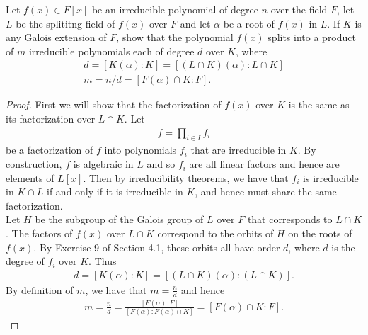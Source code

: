 \documentclass[num=12,duedate=04-28-21,course=Algebra\ II,proflastname=Walton]{hwtemplate}
\begin{document}
\problem[5] %
\begin{claim}
	Let \(f(x) \in F[x]\) be an irreducible polynomial of degree \(n\) over the field \(F\), let \(L\) be the splititng field of \(f(x)\) over \(F\) and let \(\alpha \) be a root of \(f(x)\) in \(L\). If \(K\) is any Galois extension of \(F\), show that the polynomial \(f(x)\) splits into a product of \(m\) irreducible polynomials each of degree \(d\) over \(K\), where
	\begin{align*}
		d = [K(\alpha ):K] = [(L\cap K)(\alpha ) : L\cap K]\\
		m = n / d = [F(\alpha )\cap K : F].
	\end{align*}
\end{claim}

\begin{proof}
	First we will show that the factorization of \(f(x)\) over \(K\) is the same as its factorization over \(L \cap K\). Let
	\begin{align*}
		f = \prod_{i \in I} f_i 
	\end{align*}
	be a factorization of \(f\) into polynomials \(f_i\) that are irreducible in \(K\). By construction, \(f\) is algebraic in \(L\) and so \(f_i\) are all linear factors and hence are elements of \(L[x]\). Then by irreducibility theorems, we have that \(f_i\) is irreducible in \(K\cap L\) if and only if it is irreducible in \(K\), and hence must share the same factorization.\\

	Let \(H\) be the subgroup of the Galois group of \(L\) over \(F\) that corresponds to \(L\cap K\). The factors of \(f(x)\) over \(L \cap K\) correspond to the orbits of \(H\) on the roots of \(f(x)\). By Exercise 9 of Section 4.1, these orbits all have order \(d\), where \(d\) is the degree of \(f_i\) over \(K\). Thus
	\begin{align*}
		d = [K(\alpha ):K] = [ (L\cap K) (\alpha ) : (L\cap K)].
	\end{align*}
	By definition of \(m\), we have that \(m = \frac{n}{d}\) and hence
	\begin{align*}
		m = \frac{n}{d} = \frac{[F(\alpha ):F]}{[F(\alpha ):F(\alpha )\cap K]} = [F(\alpha )\cap K : F].
	\end{align*}
\end{proof}
\end{document}
